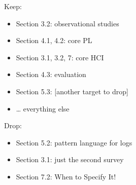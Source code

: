 Keep:

\begin{itemize}
  \item Section 3.2: observational studies
  \item Section 4.1, 4.2: core PL
  \item Section 3.1, 3.2, 7: core HCI
  \item Section 4.3: evaluation
  \item Section 5.3: [another target to drop]
  \item \ldots{} everything else
\end{itemize}

Drop:

\begin{itemize}
  \item Section 5.2: pattern language for logs
  \item Section 3.1: just the second survey
  \item Section 7.2: When to Specify It!
\end{itemize}
